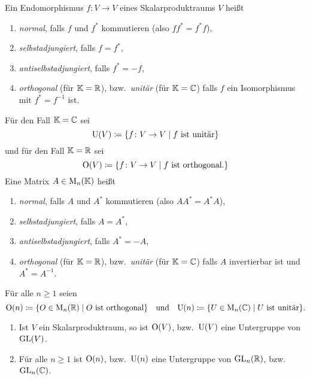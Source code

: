 \begin{definition}
  Ein Endomorphismus $f \colon V \to V$ eines Skalarproduktraums $V$ heißt
  \begin{enumerate}[leftmargin=*, label=\roman*)]
    \item
      \emph{normal}, falls $f$ und $f^*$ kommutieren (also $f f^* = f^* f$),
    \item
      \emph{selbstadjungiert}, falls $f = f^*$,
    \item
      \emph{antiselbstadjungiert}, falls $f^* = -f$,
    \item
      \emph{orthogonal} (für $\mathbb{K} = \mathbb{R}$), bzw.\ \emph{unitär} (für $\mathbb{K} = \mathbb{C}$) falls $f$ ein Isomorphismus mit $f^* = f^{-1}$ ist.
  \end{enumerate}
  Für den Fall $\mathbb{K} = \mathbb{C}$ sei
  \[
    \mathrm{U}(V)
    \coloneqq
    \{
      f \colon V \to V
      \mid
      \text{$f$ ist unitär}
    \}
  \]
  und für den Fall $\mathbb{K} = \mathbb{R}$ sei
  \[
    \mathrm{O}(V)
    \coloneqq
    \{
      f \colon V \to V
      \mid
      \text{$f$ ist orthogonal}.
    \}
  \]
  Eine Matrix $A \in \mathrm{M}_n(\mathbb{K})$ heißt
  \begin{enumerate}[leftmargin=*, label=\Roman*)]
    \item
      \emph{normal}, falls $A$ und $A^*$ kommutieren (also $A A^* = A^* A$),
    \item
      \emph{selbstadjungiert}, falls $A = A^*$,
    \item
      \emph{antiselbstadjungiert}, falls $A^* = -A$,
    \item
      \emph{orthogonal} (für $\mathbb{K} = \mathbb{R}$), bzw.\ \emph{unitär} (für $\mathbb{K} = \mathbb{C}$) falls $A$ invertierbar ist und $A^* = A^{-1}$.
  \end{enumerate}
  Für alle $n \geq 1$ seien
  \[
    \mathrm{O}(n)
    \coloneqq
    \{
      O \in \mathrm{M}_n(\mathbb{R})
      \mid
      \text{$O$ ist orthogonal}
    \}
    \quad\text{und}\quad
    \mathrm{U}(n)
    \coloneqq
    \{
      U \in \mathrm{M}_n(\mathbb{C})
      \mid
      \text{$U$ ist unitär}
    \}.
  \]
\end{definition}


\begin{proposition}
  \begin{enumerate}[leftmargin=*, label=\roman*)]
    \item
      Ist $V$ ein Skalarproduktraum, so ist $\mathrm{O}(V)$, bzw.\ $\mathrm{U}(V)$ eine Untergruppe von $\mathrm{GL}(V)$.
    \item
      Für alle $n \geq 1$ ist $\mathrm{O}(n)$, bzw.\ $\mathrm{U}(n)$ eine Untergruppe von $\mathrm{GL}_n(\mathbb{R})$, bzw.\ $\mathrm{GL}_n(\mathbb{C})$.
  \end{enumerate}
\end{proposition}


